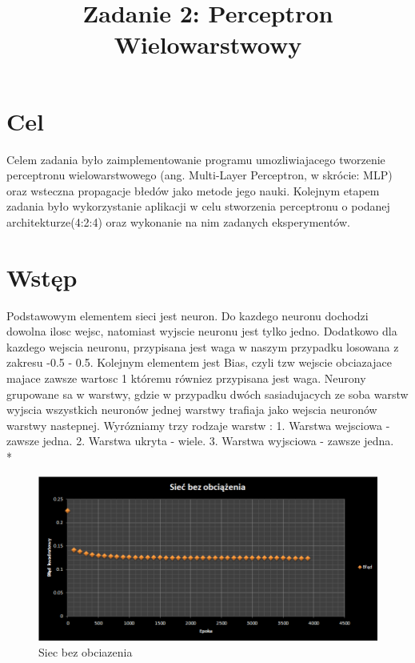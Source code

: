 \documentclass{classrep}
\author{
  \studentinfo{Łukasz Ochmański}{183566} \and
  \studentinfo{Przemysław Szwajkowski}{173524}
}
\title{Zadanie 2: Perceptron Wielowarstwowy}
\begin{document}
\maketitle


\section{Cel}
Celem zadania było zaimplementowanie programu umozliwiajacego tworzenie
perceptronu wielowarstwowego (ang. Multi-Layer Perceptron, w skrócie:
MLP) oraz wsteczna propagacje błedów jako metode jego nauki. Kolejnym
etapem zadania było wykorzystanie aplikacji w celu stworzenia perceptronu
o podanej architekturze(4:2:4) oraz wykonanie na nim zadanych
eksperymentów.

\section{Wstęp}
Podstawowym elementem sieci jest neuron. Do kazdego neuronu dochodzi
dowolna ilosc wejsc, natomiast wyjscie neuronu jest tylko jedno. Dodatkowo
dla kazdego wejscia neuronu, przypisana jest waga w naszym przypadku losowana
z zakresu -0.5 - 0.5. Kolejnym elementem jest Bias, czyli tzw wejscie
obciazajace majace zawsze wartosc 1 któremu równiez przypisana jest waga.
Neurony grupowane sa w warstwy, gdzie w przypadku dwóch sasiadujacych
ze soba warstw wyjscia wszystkich neuronów jednej warstwy trafiaja jako
wejscia neuronów warstwy nastepnej. Wyrózniamy trzy rodzaje warstw :
1. Warstwa wejsciowa - zawsze jedna.
2. Warstwa ukryta - wiele.
3. Warstwa wyjsciowa - zawsze jedna.
\\*

\begin{figure}[ht]
\centering
			\includegraphics[scale=0.65]{pictures/test01.png}
	\caption{Siec bez obciazenia}
	\label{fig:Siec bez obciazenia}
\end{figure}
\end{document}
